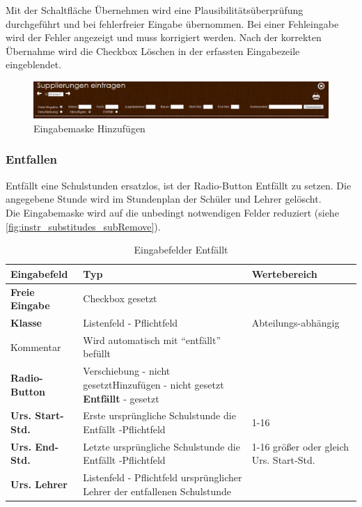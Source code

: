 Mit der Schaltfläche Übernehmen wird eine Plausibilitätsüberprüfung durchgeführt und bei fehlerfreier Eingabe übernommen. Bei einer Fehleingabe wird der Fehler angezeigt und muss korrigiert werden. Nach der korrekten Übernahme wird die Checkbox Löschen in der erfassten Eingabezeile eingeblendet.
\begin{figure}[H]
\centering
\includegraphics[keepaspectratio=true, width=17cm]{images/screenshots/substitudes_add.png}
\caption{Eingabemaske Hinzufügen}
\label{fig:instr_substitudes_subAdd}
\end{figure}
\subsubsection{Entfallen}\label{sec:instr_admin_sub_remove}
Entfällt eine Schulstunden ersatzlos, ist der Radio-Button Entfällt zu setzen. Die angegebene Stunde wird im Stundenplan der Schüler und Lehrer gelöscht.\\
Die Eingabemaske wird auf die unbedingt notwendigen Felder reduziert (siehe \autoref{fig:instr_substitudes_subRemove}).
\begin{table}[H]
\centering
\begin{tabular}{p{3 cm}p{6 cm}p{5 cm}}
   \toprule
   \textbf{Eingabefeld} & \textbf{Typ} & \textbf{Wertebereich} \\
   \midrule
          \textbf{Freie Eingabe} & Checkbox \newline gesetzt & \\
          \hline
          \textbf{Klasse} & Listenfeld - Pflichtfeld & Abteilungs-abhängig \\
          \hline
          Kommentar & Wird automatisch mit \enquote{entfällt} befüllt & \\
          \hline
          \textbf{Radio-Button} & Verschiebung - nicht gesetzt\newline Hinzufügen - nicht gesetzt \newline \textbf{Entfällt} - gesetzt & \\
          \hline
          \textbf{Urs. Start-Std.} & Erste ursprüngliche Schulstunde die Entfällt  -Pflichtfeld & 1-16 \\
          \hline
          \textbf{Urs. End-Std.} & Letzte ursprüngliche Schulstunde die Entfällt  -Pflichtfeld & 1-16 \newline größer oder gleich Urs. Start-Std.\\
          \hline
          \textbf{Urs. Lehrer} & Listenfeld - Pflichtfeld \newline ursprünglicher Lehrer der entfallenen Schulstunde\\
   \bottomrule
\end{tabular}
\caption{Eingabefelder Entfällt}
\end{table}
